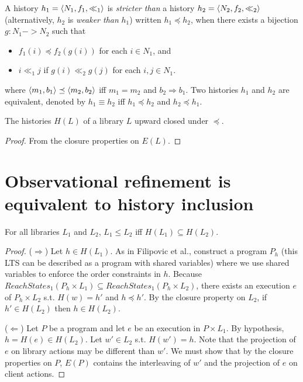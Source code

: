 A history $h_1 = \left\langle {N_1, f_1, \ll_1} \right\rangle$ is \emph{stricter than} a history $h_2
= \left\langle {N_2, f_2, \ll_2} \right\rangle$ (alternatively, $h_2$ is \emph{weaker than} $h_1$)
written $h_1 \preceq h_2$, when there exists a bijection $g : N_1 -> N_2$ such
that
\begin{itemize}

  \item $f_1(i) \preceq f_2(g(i))$ for each $i \in N_1$, and
  
  \item $i \ll_1 j$ if $g(i) \ll_2 g(j)$ for each $i,j \in N_1$.

\end{itemize}
where $\left\langle {m_1,b_1} \right\rangle \preceq \left\langle {m_2,b_2} \right\rangle$ iff $m_1 = m_2$ and $b_2
\Rightarrow b_1$. Two histories $h_1$ and $h_2$ are equivalent, denoted by $h_1
\equiv h_2$ iff $h_1 \preceq h_2$ and $h_2 \preceq h_1$.

\begin{lemma}
  
  The histories $H(L)$ of a library $L$ upward closed under $\preceq$.

\end{lemma}

\begin{proof}

  From the closure properties on $E(L)$.

\end{proof}

\section{Observational refinement is equivalent to history inclusion}

\begin{theorem}
For all libraries $L_1$ and $L_2$, 
$L_1 \leq L_2$ iff $H(L_1) \subseteq H(L_2)$.
\end{theorem}
\begin{proof}
($\Rightarrow$) Let $h\in H(L_1)$. As in Filipovic et al., construct a program $P_h$ (this LTS can be described as a program with shared variables) where we use shared variables to enforce the order constraints in $h$. Because $ReachStates_1(P_h\times L_1) \subseteq ReachStates_1(P_h\times L_2)$, there exists an execution $e$ of $P_h\times L_2$ s.t. $H(w)=h'$ and $h\preceq h'$. By the closure property on $L_2$, if $h'\in H(L_2)$ then $h\in H(L_2)$. 

($\Leftarrow$) Let $P$ be a program and let $e$ be an execution in $P\times L_1$. By hypothesis, $h=H(e)\in H(L_2)$. Let $w'\in L_2$ s.t. $H(w')=h$. Note that the projection of $e$ on library actions may be different than $w'$. We must show that by the closure properties on $P$, $E(P)$ contains the interleaving of $w'$ and the projection of $e$ on client actions.
\end{proof}

